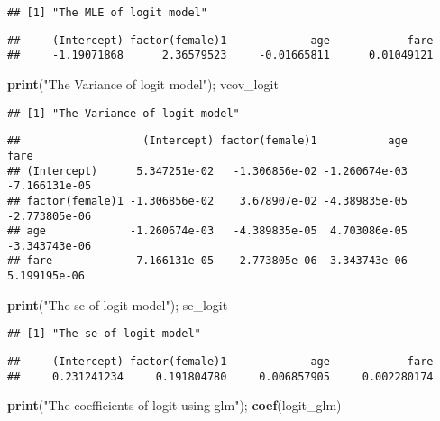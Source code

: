\documentclass[
  12pt,
]{article}
\newenvironment{Shaded}{\begin{snugshade}}{\end{snugshade}}
\newcommand{\KeywordTok}[1]{\textcolor[rgb]{0.13,0.29,0.53}{\textbf{#1}}}
\newcommand{\NormalTok}[1]{#1}
\newcommand{\StringTok}[1]{\textcolor[rgb]{0.31,0.60,0.02}{#1}}
\begin{document}
\begin{verbatim}
## [1] "The MLE of logit model"
\end{verbatim}

\begin{verbatim}
##     (Intercept) factor(female)1             age            fare 
##     -1.19071868      2.36579523     -0.01665811      0.01049121
\end{verbatim}

\begin{Shaded}
\begin{Highlighting}[]
\KeywordTok{print}\NormalTok{(}\StringTok{"The Variance of logit model"}\NormalTok{); vcov\_logit}
\end{Highlighting}
\end{Shaded}

\begin{verbatim}
## [1] "The Variance of logit model"
\end{verbatim}

\begin{verbatim}
##                   (Intercept) factor(female)1           age          fare
## (Intercept)      5.347251e-02   -1.306856e-02 -1.260674e-03 -7.166131e-05
## factor(female)1 -1.306856e-02    3.678907e-02 -4.389835e-05 -2.773805e-06
## age             -1.260674e-03   -4.389835e-05  4.703086e-05 -3.343743e-06
## fare            -7.166131e-05   -2.773805e-06 -3.343743e-06  5.199195e-06
\end{verbatim}

\begin{Shaded}
\begin{Highlighting}[]
\KeywordTok{print}\NormalTok{(}\StringTok{"The se of logit model"}\NormalTok{); se\_logit}
\end{Highlighting}
\end{Shaded}

\begin{verbatim}
## [1] "The se of logit model"
\end{verbatim}

\begin{verbatim}
##     (Intercept) factor(female)1             age            fare 
##     0.231241234     0.191804780     0.006857905     0.002280174
\end{verbatim}

\begin{Shaded}
\begin{Highlighting}[]
\KeywordTok{print}\NormalTok{(}\StringTok{"The coefficients of logit using glm"}\NormalTok{); }\KeywordTok{coef}\NormalTok{(logit\_glm)}
\end{Highlighting}
\end{Shaded}
\end{document}
